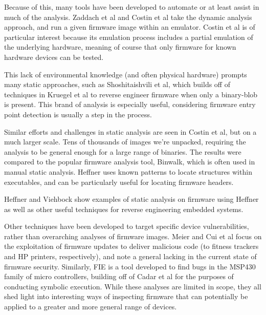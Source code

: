 \documentclass[letterpaper,twocolumn,10pt]{article}
\begin{document}
Because of this, many tools have been developed to automate or at least assist in much of the analysis. Zaddach et al\cite{avatar} and Costin et al\cite{dynamicanalysisatscale2015} take the dynamic analysis approach, and run a given firmware image within an emulator. Costin et al\cite{dynamicanalysisatscale2015} is of particular interest because its emulation process includes a partial emulation of the underlying hardware, meaning of course that only firmware for known hardware devices can be tested.

This lack of environmental knowledge (and often physical hardware) prompts many static approaches, such as Shoshitaishvili et al\cite{firmalice2015}, which builds off of techniques in Kruegel et al\cite{staticdisassembly2002} to reverse engineer firmware when only a binary-blob is present. This brand of analysis is especially useful, considering firmware entry point detection is usually a step in the process. 

Similar efforts and challenges in static analysis are seen in Costin et al\cite{analysisofembeddedfirmware2014}, but on a much larger scale. Tens of thousands of images we’re unpacked, requiring the analysis to be general enough for a large range of binaries. The results were compared to the popular firmware analysis tool, Binwalk\cite{binwalk}, which is often used in manual static analysis. Heffner\cite{binwalk} uses known patterns to locate structures within executables, and can be particularly useful for locating firmware headers.

Heffner\cite{wrt120N2014} and Viehbock\cite{braindump2011} show examples of static analysis on firmware using Heffner\cite{binwalk} as well as other useful techniques for reverse engineering embedded systems.

Other techniques have been developed to target specific device vulnerabilities, rather than overarching analyses of firmware images. Meier\cite{fitnesstrackers2016} and Cui et al\cite{firmwaremodsattack} focus on the exploitation of firmware updates to deliver malicious code (to fitness trackers and HP printers, respectively), and note a general lacking in the current state of firmware security. Similarly, FIE\cite{fie2013} is a tool developed to find bugs in the MSP430 family of micro controllers, building off of Cadar et al\cite{klee2008} for the purposes of conducting symbolic execution. While these analyses are limited in scope, they all shed light into interesting ways of inspecting firmware that can potentially be applied to a greater and more general range of devices. 
\end{document}
